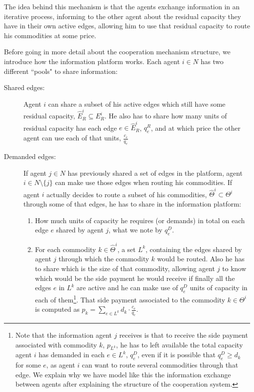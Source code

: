 \documentclass{article}
\begin{document}
The idea behind this mechanism is that the agents exchange information in an iterative process, informing to the other agent about the residual capacity they have in their own active edges, allowing him to use that residual capacity to route his commodities at some price.

Before going in more detail about the cooperation mechanism structure, we introduce how the information platform works. Each agent $i\in N$ has two different ``pools" to share information:

\begin{description}
	\item[Shared edges:] Agent $i$ can share a subset of his active edges which still have some residual capacity, $\widehat{E}_R^i\subseteq E_R^i$. He also has to share how many units of residual capacity has each edge $e\in \widehat{E}_R^i$, $q_e^R$, and at which price the other agent can use each of that units, $\frac{c_e}{q_e}$
	\item[Demanded edges:] If agent $j\in N$ has previously shared a set of edges in the platform, agent $i\in N\setminus\{j\}$ can make use those edges when routing his commodities. If agent $i$ actually decides to route a subset of his commodities, $\widehat{\Theta}^i\subset \Theta ^i$ through some of that edges, he has to share in the information platform:
	\begin{enumerate}
		\item How much units of capacity he requires (or demands) in total on each edge $e$ shared by agent $j$, what we note by $q_e^D$.
	\item For each commodity $k\in \widehat{\Theta}^i$, a set $L^k$, containing the edges shared by agent $j$ through which the commodity $k$ would be routed. Also he has to share which is the size of that commodity, allowing agent $j$ to know which would be the side payment he would receive if finally all the edges $e$ in $L^k$ are active and he can make use of $q_e^D$ units of capacity in each of them\footnote{\label{ft:sidepaymentexplanation}
Note that the information agent $j$ receives is that to receive the side payment associated with commodity $k$, $p_{L^k}$, he has to left available the total capacity agent $i$ has demanded in each $e\in L^k$, $q_e^D$, even if it is possible that $q_e^D\geq d_k$ for some $e$, as agent $i$ can want to route several commodities through that edge. We explain why we have model like this the information exchange between agents after explaining the structure of the cooperation system.}.
That side payment associated to the commodity $k\in \Theta^i$ is computed as $p_k=\sum_{e \in L^k} d_k\cdot \frac{c_e}{q_e}$. 
	\end{enumerate}
		
\end{description}	
\end{document}
